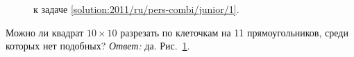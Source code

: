 \ifsolution
\begin{figure}\centering
    \caption{к задаче \ref{solution:2011/ru/pers-combi/junior/1}.}
    \label{fig:solution:2011/ru/pers-combi/junior/1}
\end{figure}
\fi %

\problem
Можно ли квадрат $10 \times 10$ разрезать по клеточкам на 11 прямоугольников,
среди которых нет подобных?
\solution
\label{solution:2011/ru/pers-combi/junior/1}%
\emph{Ответ:} да.
Рис.~\ref{fig:solution:2011/ru/pers-combi/junior/1}.
\endproblem
